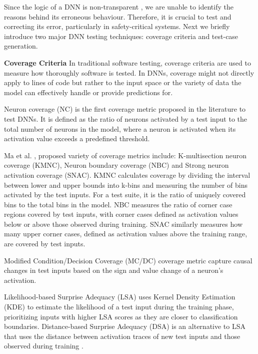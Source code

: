 \documentclass[10pt, conference, a4paper, final]{IEEEtran}
\begin{document}
Since the logic of a DNN is non-transparent \cite{deepxplore}, we are unable to identify the reasons behind its erroneous behaviour. Therefore, it is crucial to test and correcting its error, particularly in safety-critical systems. Next we briefly introduce two major DNN testing techniques: coverage criteria and test-case generation.

\smallskip\noindent%
\textbf{Coverage Criteria}
In traditional software testing, coverage criteria are used to measure how thoroughly software is tested. In DNNs, coverage might not directly apply to lines of code but rather to the input space or the variety of data the model can effectively handle or provide predictions for.

Neuron coverage (NC) \cite{deepxplore} is the first coverage metric proposed in the literature to test DNNs. It is defined as the ratio of neurons activated by a test input to the total number of neurons in the model, where a neuron is activated when its activation value exceeds a predefined threshold. 

Ma et al. \cite{deepguage}, proposed variety of coverage metrics include: K-multisection neuron coverage (KMNC), Neuron boundary coverage (NBC) and Strong neuron activation coverage (SNAC). KMNC calculates coverage by dividing the interval between lower and upper bounds into k-bins and measuring the number of bins activated by the test inputs. For a test suite, it is the ratio of uniquely covered bins to the total bins in the model. NBC measures the ratio of corner case regions covered by test inputs, with corner cases defined as activation values below or above those observed during training. SNAC similarly measures how many upper corner cases, defined as activation values above the training range, are covered by test inputs. 

Modified Condition/Decision Coverage (MC/DC) \cite{SunY} coverage metric  capture causal changes in test inputs based on the sign and value change of a neuron's activation. 

Likelihood-based Surprise Adequacy (LSA) uses Kernel Density Estimation (KDE) to estimate the likelihood of a test input during the training phase, prioritizing inputs with higher LSA scores as they are closer to classification boundaries. Distance-based Surprise Adequacy (DSA) is an alternative to LSA that uses the distance between activation traces of new test inputs and those observed during training \cite{KimJ}.
\end{document}
